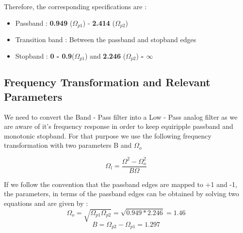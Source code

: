 \documentclass{article}
\begin{document}
Therefore, the corresponding specifications are :
\begin{itemize}
    \item Passband :  \textbf{0.949} ($\Omega_{p1}$) - \textbf{2.414} ($\Omega_{p2}$)
    \item  Transition band : Between the passband and stopband edges
    \item Stopband : \textbf{0 - 0.9}($\Omega_{p1}$) and \textbf{2.246} ($\Omega_{p2}$) \textbf{- $\infty$}
\end{itemize}


\subsection{Frequency Transformation and Relevant Parameters}
We need to convert the Band - Pass filter into a Low - Pass analog filter as we are aware of it's frequency response in order to keep equiripple passband and monotonic stopband. For that purpose we use the following frequency transformation with two parameters B and $\Omega_o$

\begin{equation*}
    \Omega_l = \frac{\Omega^2 - \Omega_o^2}{B\Omega}
\end{equation*}

\vspace{1em}
\noindent
If we follow the convention that the passband edges are mapped to +1 and -1, the parameters, in terms of the passband edges can be obtained by solving two equations and are given by :
\begin{equation*}
    \Omega_o = \sqrt{\Omega_{p1} \Omega_{p2}} = \sqrt{0.949*2.246} = 1.46
\end{equation*}\begin{equation*}
    B = \Omega_{p2}  - \Omega_{p1} = 1.297
\end{equation*}
\end{document}
